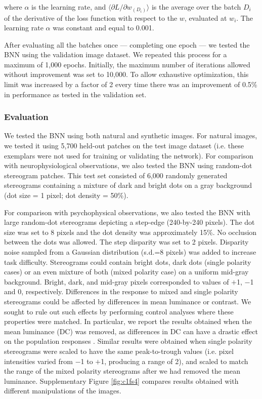 where $\alpha$ is the learning rate, and $ \big \langle \partial L/ \partial w_{(D_i)}\big \rangle$ is the average over the batch $D_i$ of the derivative of the loss function with respect to the $w$, evaluated at $w_i$. The learning rate $\alpha$ was constant and equal to 0.001. 

After evaluating all the batches once --- completing one epoch --- we tested the BNN using the validation image dataset. We repeated this process for a maximum of 1,000 epochs. Initially, the maximum number of iterations allowed without improvement was set to 10,000. To allow exhaustive optimization, this limit was increased by a factor of 2 every time there was an improvement of 0.5\% in performance as tested in the validation set.

\subsubsection*{Evaluation}

We tested the BNN using both natural and synthetic images. For natural images, we tested it using 5,700 held-out patches on the test image dataset (i.e. these exemplars were not used for training or validating the network). For comparison with neurophysiological observations, we also tested the BNN using random-dot stereogram patches. This test set consisted of 6,000 randomly generated stereograms containing a mixture of dark and bright dots on a gray background (dot size = 1 pixel; dot density = 50\%). 

For comparison with psychophysical observations, we also tested the BNN with large random-dot stereograms depicting a step-edge (240-by-240 pixels). The dot size was set to 8 pixels and the dot density was approximately 15\%. No occlusion between the dots was allowed. The step disparity was set to 2 pixels. Disparity noise sampled from a Gaussian distribution (s.d.=8 pixels) was added to increase task difficulty. Stereograms could contain bright dots, dark dots (single polarity cases) or an even mixture of both (mixed polarity case) on a uniform mid-gray background. Bright, dark, and mid-gray pixels corresponded to values of $+$1, $-$1 and 0, respectively. Differences in the response to mixed and single polarity stereograms could be affected by differences in mean luminance or contrast. We sought to rule out such effects by performing control analyses where these properties were matched. In particular, we report the results obtained when the mean luminance (DC) was removed, as differences in DC can have a drastic effect on the population responses \cite{Read:2011im}. Similar results were obtained when single polarity stereograms were scaled to have the same peak-to-trough values (i.e. pixel intensities varied from $-$1 to $+$1, producing a range of 2), and scaled to match the range of the mixed polarity stereograms after we had removed the mean luminance. Supplementary Figure \ref{fig:c1fs4} compares results obtained with different manipulations of the images.

